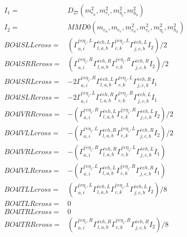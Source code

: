 \documentclass[A4,landscape]{article}
\begin{document}
\begin{align} 
I_1 = & D_{27}(m^2_{e_{{a}}}, m^2_{e_{{c}}}, m^2_{\eta_i}, m^2_{h_{{b}}}) \\ 
I_2 = & MMD0(m_{e_{{a}}}, m_{e_{{c}}}, m^2_{e_{{a}}}, m^2_{e_{{c}}}, m^2_{\eta_i}, m^2_{h_{{b}}}) \\ 
  BO4lSLLcross= & ( \Gamma^{\bar{e}e \eta_i ,L}_{a, i} \Gamma^{\bar{e}e h ,L}_{l, a, b} \Gamma^{\bar{e}e \eta_i ,L}_{c, k} \Gamma^{\bar{e}e h ,L}_{j, c, b} I_2)/2 \\ 
  BO4lSRRcross= & ( \Gamma^{\bar{e}e \eta_i ,R}_{a, i} \Gamma^{\bar{e}e h ,R}_{l, a, b} \Gamma^{\bar{e}e \eta_i ,R}_{c, k} \Gamma^{\bar{e}e h ,R}_{j, c, b} I_2)/2 \\ 
  BO4lSRLcross= & -2  \Gamma^{\bar{e}e \eta_i ,R}_{a, i} \Gamma^{\bar{e}e h ,L}_{l, a, b} \Gamma^{\bar{e}e \eta_i ,L}_{c, k} \Gamma^{\bar{e}e h ,R}_{j, c, b} I_1 \\ 
  BO4lSLRcross= & -2  \Gamma^{\bar{e}e \eta_i ,L}_{a, i} \Gamma^{\bar{e}e h ,R}_{l, a, b} \Gamma^{\bar{e}e \eta_i ,R}_{c, k} \Gamma^{\bar{e}e h ,L}_{j, c, b} I_1 \\ 
  BO4lVRRcross= & -( \Gamma^{\bar{e}e \eta_i ,R}_{a, i} \Gamma^{\bar{e}e h ,L}_{l, a, b} \Gamma^{\bar{e}e \eta_i ,R}_{c, k} \Gamma^{\bar{e}e h ,L}_{j, c, b} I_2)/2 \\ 
  BO4lVLLcross= & -( \Gamma^{\bar{e}e \eta_i ,L}_{a, i} \Gamma^{\bar{e}e h ,R}_{l, a, b} \Gamma^{\bar{e}e \eta_i ,L}_{c, k} \Gamma^{\bar{e}e h ,R}_{j, c, b} I_2)/2 \\ 
  BO4lVRLcross= & -( \Gamma^{\bar{e}e \eta_i ,R}_{a, i} \Gamma^{\bar{e}e h ,R}_{l, a, b} \Gamma^{\bar{e}e \eta_i ,L}_{c, k} \Gamma^{\bar{e}e h ,L}_{j, c, b} I_1) \\ 
  BO4lVLRcross= & -( \Gamma^{\bar{e}e \eta_i ,L}_{a, i} \Gamma^{\bar{e}e h ,L}_{l, a, b} \Gamma^{\bar{e}e \eta_i ,R}_{c, k} \Gamma^{\bar{e}e h ,R}_{j, c, b} I_1) \\ 
  BO4lTLLcross= & ( \Gamma^{\bar{e}e \eta_i ,L}_{a, i} \Gamma^{\bar{e}e h ,L}_{l, a, b} \Gamma^{\bar{e}e \eta_i ,L}_{c, k} \Gamma^{\bar{e}e h ,L}_{j, c, b} I_2)/8 \\ 
  BO4lTLRcross= & 0 \\ 
  BO4lTRLcross= & 0 \\ 
  BO4lTRRcross= & ( \Gamma^{\bar{e}e \eta_i ,R}_{a, i} \Gamma^{\bar{e}e h ,R}_{l, a, b} \Gamma^{\bar{e}e \eta_i ,R}_{c, k} \Gamma^{\bar{e}e h ,R}_{j, c, b} I_2)/8 \\ 
\end{align} 
\end{document}
